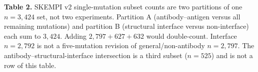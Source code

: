 \caption{{\bf Table 2.} SKEMPI v2 single-mutation subset counts are two partitions of one $n=3{,}424$ set, not two experiments. Partition A (antibody--antigen versus all remaining mutations) and partition B (structural interface versus non-interface) each sum to $3{,}424$. Adding $2{,}797+627+632$ would double-count. Interface $n=2{,}792$ is not a five-mutation revision of general/non-antibody $n=2{,}797$. The antibody--structural-interface intersection is a third subset ($n=525$) and is not a row of this table.}
